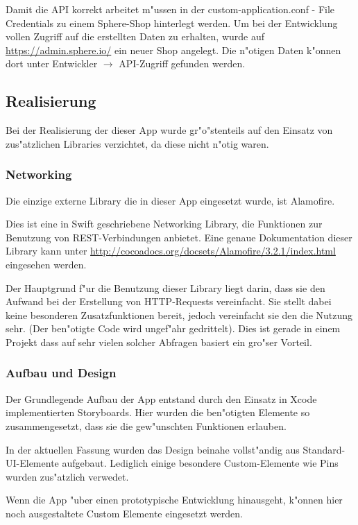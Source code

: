 Damit die API korrekt arbeitet m"ussen in der custom-application.conf - File Credentials zu einem Sphere-Shop hinterlegt werden. 
Um bei der Entwicklung vollen Zugriff auf die erstellten Daten zu erhalten, wurde auf  \url{https://admin.sphere.io/} ein neuer Shop angelegt. 
Die n"otigen Daten k"onnen dort unter Entwickler $\rightarrow$ API-Zugriff  gefunden werden.

\subsection{Realisierung}

Bei der Realisierung der dieser App wurde gr"o"stenteils auf den Einsatz von zus"atzlichen Libraries verzichtet, da diese nicht n"otig waren. 

\subsubsection*{Networking}
Die einzige externe Library die in dieser App eingesetzt wurde, ist Alamofire. 

Dies ist eine in Swift geschriebene Networking Library, die Funktionen zur Benutzung von REST-Verbindungen anbietet.
Eine genaue Dokumentation dieser Library kann unter \url{http://cocoadocs.org/docsets/Alamofire/3.2.1/index.html} eingesehen werden.

Der Hauptgrund f"ur die Benutzung dieser Library liegt darin, dass sie den Aufwand bei der Erstellung von HTTP-Requests vereinfacht. 
Sie stellt dabei keine besonderen Zusatzfunktionen bereit, jedoch vereinfacht sie den die Nutzung sehr. (Der ben"otigte Code wird ungef"ahr gedrittelt). 
Dies ist gerade in einem Projekt dass auf sehr vielen solcher Abfragen basiert ein gro"ser Vorteil.

\subsubsection*{Aufbau und Design}

Der Grundlegende Aufbau der App entstand durch den Einsatz in Xcode implementierten Storyboards. 
Hier wurden die ben"otigten Elemente so zusammengesetzt, dass sie die gew"unschten Funktionen erlauben. 

In der aktuellen Fassung wurden das Design beinahe vollst"andig aus Standard-UI-Elemente aufgebaut.
Lediglich einige besondere Custom-Elemente wie Pins wurden zus"atzlich verwedet. 

Wenn die App "uber einen prototypische Entwicklung hinausgeht, k"onnen hier noch ausgestaltete Custom Elemente eingesetzt werden.

